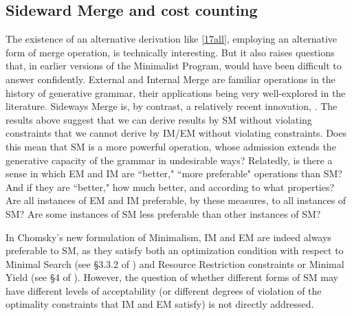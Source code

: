 \documentclass[12pt]{amsart}
\numberwithin{equation}{section}
\begin{document}
\smallskip
\subsection{Sideward Merge and cost counting}\label{preSMcostsSec}

The existence of an alternative derivation like \eqref{17all}, employing an alternative 
form of merge operation, is technically interesting. But it also raises questions that, in earlier versions 
of the Minimalist Program, would have been difficult to answer confidently. External and Internal Merge 
are familiar operations in the history of generative grammar, their applications being very well-explored 
in the literature. Sideways Merge is, by contrast, a relatively recent innovation, \cite{Nunes}. 
The results above suggest that we can derive results by SM without violating constraints that we 
cannot derive by IM/EM without violating constraints. Does this mean that SM is a more 
powerful operation, whose admission extends the generative capacity of the grammar in undesirable ways? 
Relatedly, is there a sense in which EM and IM are ``better," ``more preferable" operations than SM? 
And if they are ``better," how much better, and according to what properties? Are all instances 
of EM and IM preferable, by these measures, to all instances of SM? Are some instances of 
SM less preferable than other instances of SM?

\smallskip

In Chomsky's new formulation of Minimalism, IM and EM are indeed always preferable to SM,
as they satisfy both an optimization condition with respect to Minimal Search (see \S 3.3.2 of
\cite{ChomskyElements}) and Resource Restriction constraints or Minimal Yield (see \S 4 of
\cite{ChomskyElements}).  However, the question of whether different forms of SM may
have different levels of acceptability (or different degrees of violation of the 
optimality constraints that IM and EM satisfy) is not directly addressed. 

\smallskip
\end{document}
